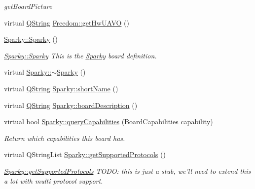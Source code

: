\begin{DoxyCompactItemize}
\begin{DoxyCompactList}\small\item\em get\-Board\-Picture \end{DoxyCompactList}\item 
virtual \hyperlink{group___u_a_v_objects_plugin_gab9d252f49c333c94a72f97ce3105a32d}{\-Q\-String} \hyperlink{group___boards___tau_labs_plugin_ga09397e9d9712878ddda4020b236f9ed5}{\-Freedom\-::get\-Hw\-U\-A\-V\-O} ()
\item 
\hyperlink{group___boards___tau_labs_plugin_ga81d45abeade9a73a7d354c71e826e906}{\-Sparky\-::\-Sparky} ()
\begin{DoxyCompactList}\small\item\em \hyperlink{group___boards___tau_labs_plugin_ga81d45abeade9a73a7d354c71e826e906}{\-Sparky\-::\-Sparky} \-This is the \hyperlink{class_sparky}{\-Sparky} board definition. \end{DoxyCompactList}\item 
virtual \hyperlink{group___boards___tau_labs_plugin_gafad187a9e7207b7b14ca0c71eaa7ad48}{\-Sparky\-::$\sim$\-Sparky} ()
\item 
virtual \hyperlink{group___u_a_v_objects_plugin_gab9d252f49c333c94a72f97ce3105a32d}{\-Q\-String} \hyperlink{group___boards___tau_labs_plugin_gac9c737083d657f5a125688683f1adf88}{\-Sparky\-::short\-Name} ()
\item 
virtual \hyperlink{group___u_a_v_objects_plugin_gab9d252f49c333c94a72f97ce3105a32d}{\-Q\-String} \hyperlink{group___boards___tau_labs_plugin_gad8873cb94f7f63588e8e88b20d511d76}{\-Sparky\-::board\-Description} ()
\item 
virtual bool \hyperlink{group___boards___tau_labs_plugin_ga4b25de756ae522bc8ec649c4885a4e91}{\-Sparky\-::query\-Capabilities} (\-Board\-Capabilities capability)
\begin{DoxyCompactList}\small\item\em \-Return which capabilities this board has. \end{DoxyCompactList}\item 
virtual \-Q\-String\-List \hyperlink{group___boards___tau_labs_plugin_gae2df29177bbd9a5f916f60eeb6be284c}{\-Sparky\-::get\-Supported\-Protocols} ()
\begin{DoxyCompactList}\small\item\em \hyperlink{group___boards___tau_labs_plugin_gae2df29177bbd9a5f916f60eeb6be284c}{\-Sparky\-::get\-Supported\-Protocols} \-T\-O\-D\-O\-: this is just a stub, we'll need to extend this a lot with multi protocol support. \end{DoxyCompactList}\item 

\end{DoxyCompactItemize}
